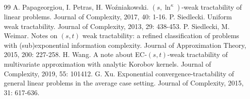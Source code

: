 \documentclass[10pt,a4paper]{amsart}
\numberwithin{equation}{section}
\begin{document}
\begin{thebibliography}{99}
 A. Papageorgiou, I. Petras, H. Wo\'zniakowski. $(s,\ln^{\kappa})$-weak tractability of linear problems. Journal of Complexity, 2017, 40: 1-16.
 P. Siedlecki. Uniform weak tractability. Journal of Complexity, 2013, 29: 438-453.
 P. Siedlecki, M. Weimar. Notes on $(s,t)$ weak tractability: a refined classification of problems with (sub)exponential information complexity. Journal of Approximation Theory, 2015, 200: 227-258.
 H. Wang. A note about EC-$(s,t)$-weak tractability of multivariate approximation with analytic Korobov kernels. Journal of Complexity, 2019, 55: 101412.
 G. Xu. Exponential convergence-tractability of general linear problems in the average case setting. Journal of Complexity, 2015, 31: 617-636.
\end{thebibliography}
\end{document}
